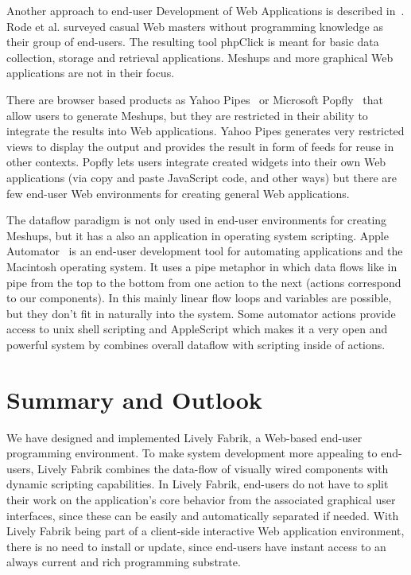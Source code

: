 \documentclass[pdftex, times, 10pt, twocolumn]{article}
\begin{document}
Another approach to end-user Development of Web Applications is described in~\cite{Rode2006EUD}. Rode et al. surveyed casual Web masters without programming knowledge as their group of end-users. The resulting tool phpClick is meant for basic data collection, storage and retrieval applications. Meshups and more graphical Web applications are not in their focus. 

There are browser based products as Yahoo Pipes~\cite{YahooPipes} or Microsoft Popfly~\cite{MicrosoftPopfly} that allow users to generate Meshups, but they are restricted in their ability to integrate the results into Web applications. Yahoo Pipes generates very restricted views to display the output and provides the result in form of feeds for reuse in other contexts. Popfly lets users integrate created widgets into their own Web applications (via copy and paste JavaScript code, and other ways) but there are few end-user Web environments for creating general Web applications. 

The dataflow paradigm is not only used in end-user environments for creating Meshups, but it has a also an application in operating system scripting. Apple Automator~\cite{AppleAutomator} is an end-user development tool for automating applications and the Macintosh operating system. It uses a pipe metaphor in which data flows like in pipe from the top to the bottom from one action to the next (actions correspond to our components). In this mainly linear flow loops and variables are possible, but they don't fit in naturally into the system. Some automator actions provide access to unix shell scripting and AppleScript which makes it a very open and powerful system by combines overall dataflow with scripting inside of actions. 



\section{Summary and Outlook}
We have designed and implemented Lively Fabrik, a Web-based end-user programming environment. To make system development more appealing to end-users, Lively Fabrik combines the data-flow of visually wired components with dynamic scripting capabilities. In Lively Fabrik, end-users do not have to split their work on the application's core behavior from the associated graphical user interfaces, since these can be easily and automatically separated if needed. With Lively Fabrik being part of a client-side interactive Web application environment, there is no need to install or update, since end-users have instant access to an always current and rich programming substrate. 
\end{document}

